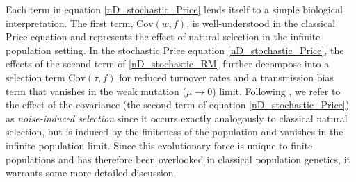 Each term in equation \eqref{nD_stochastic_Price} lends itself to a simple biological interpretation. The first term, $\textrm{Cov}(w,f)$, is well-understood in the classical Price equation and represents the effect of natural selection in the infinite population setting. In the stochastic Price equation \eqref{nD_stochastic_Price}, the effects of the second term of 
\eqref{nD_stochastic_RM} further decompose into a selection term $\textrm{Cov}(\tau,f)$ for reduced turnover rates and a transmission bias term that vanishes in the weak mutation ($\mu \to 0$) limit. Following \cite{week_white_2021}, we refer to the effect of the covariance (the second term of equation \eqref{nD_stochastic_Price}) as \emph{noise-induced selection} since it occurs exactly analogously to classical natural selection, but is induced by the finiteness of the population and vanishes in the infinite population limit. Since this evolutionary force is unique to finite populations and has therefore been overlooked in classical population genetics, it warrants some more detailed discussion.\\
